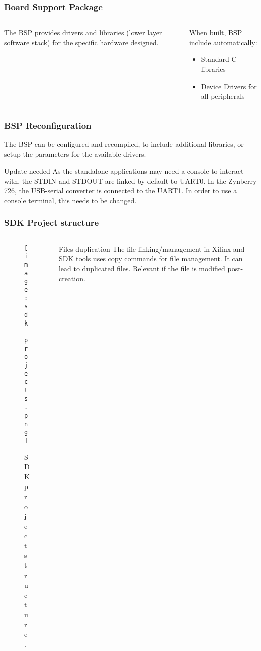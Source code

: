 \begin{frame}
	\frametitle{Board Support Package}
	\begin{columns}
		\begin{column}{0.5\textwidth}
			The BSP provides drivers and libraries (lower layer software stack) for the specific hardware designed.
		\end{column} \pause
		\begin{column}{0.5\textwidth}
			When built, BSP include automatically:
			\begin{itemize}
				\item Standard C libraries
				\item Device Drivers for all peripherals
			\end{itemize}
		\end{column}
	\end{columns}
\end{frame}

\begin{frame}
	\frametitle{BSP Reconfiguration}
	The BSP can be configured and recompiled, to include additional libraries, or setup the parameters for the available drivers.
	\vfill \pause
	\begin{alertblock}{Update needed}
		As the standalone applications may need a console to interact with, the STDIN and STDOUT are linked by default to UART0. In the Zynberry 726, the USB-serial converter is connected to the UART1. In order to use a console terminal, this needs to be changed.
	\end{alertblock}
\end{frame}

\begin{frame}
	\frametitle{SDK Project structure}
	\begin{columns}
		\begin{column}{0.25\textwidth}
			\begin{figure}
				\texttt{[image: sdk-projects.png]}
				\caption{SDK project structure.}\label{fig:sdk-projects}
			\end{figure}
		\end{column} \pause
		\begin{column}{0.6\textwidth}
			\begin{alertblock}{Files duplication}
				The file linking/management in Xilinx and SDK tools uses copy commands for file management. It can lead to duplicated files. Relevant if the file is modified post-creation.
			\end{alertblock}
		\end{column}
	\end{columns}
\end{frame}

